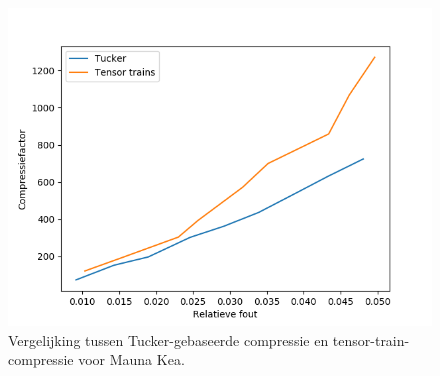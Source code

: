 \begin{figure}[]
  \centering
  \includegraphics[scale=0.7]{images/tucker_vs_tensor_trains_Mauna_Kea.png}
  \caption{Vergelijking tussen Tucker-gebaseerde compressie en tensor-train-compressie voor Mauna Kea.}
\label{fig:tucker-vs-tensor-trains-mauna-kea}
\end{figure}

